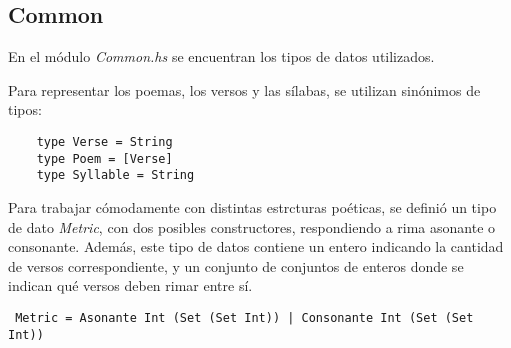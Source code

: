 \documentclass[12pt, a4paper]{article}
\begin{document}
\subsection*{Common}
En el módulo \textit{Common.hs} se encuentran los tipos de datos utilizados.

\medskip
Para representar los poemas, los versos y las sílabas, se utilizan sinónimos de tipos:
\begin{verbatim}
    type Verse = String
    type Poem = [Verse]
    type Syllable = String
\end{verbatim}

Para trabajar cómodamente con distintas estrcturas poéticas, se definió un tipo de dato \textit{Metric}, con dos posibles constructores, respondiendo a rima asonante o consonante. Además, este tipo de datos contiene un entero indicando la cantidad de versos correspondiente, y un conjunto de conjuntos de enteros donde se indican qué versos deben rimar entre sí.
\begin{verbatim}
 Metric = Asonante Int (Set (Set Int)) | Consonante Int (Set (Set Int))
\end{verbatim}
\end{document}
